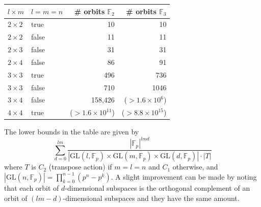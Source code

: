 \documentclass[11pt]{article}
\begin{document}
\begin{center}
  \setlength{\tabcolsep}{12pt}
  \begin{tabular}{llrr}
    $l\times m$ & $l=m=n$ & \# orbits $\mathbb{F}_2$ & \# orbits $\mathbb{F}_3$               \\
    \hline
    $2\times 2$ & true    & 10                       & 10                                     \\
    $2\times 2$ & false   & 11                       & 11                                     \\
    $2\times 3$ & false   & 31                       & 31                                     \\
    $2\times 4$ & false   & 86                       & 91                                     \\
    $3\times 3$ & true    & 496                      & 736                                    \\
    $3\times 3$ & false   & 710                      & 1046                                   \\
    $3\times 4$ & false   & 158,426\footnotemark[1]  & ($>1.6\times 10^{6}$) \footnotemark[2] \\
    $4\times 4$ & true    & ($>1.6\times 10^{11}$)   & ($>8.8\times 10^{15}$)                 \\
  \end{tabular}
\end{center}

The lower bounds in the table are given by
$$\sum_{d=0}^{lm}\frac{|\mathbb{F}_p|^{lmd}}{| \mathrm{GL}(l,\mathbb{F}_p) \times \mathrm{GL}(m,\mathbb{F}_p) \times \mathrm{GL}(d,\mathbb{F}_p)| \cdot |T|}$$ where $T$ is $C_2$ (transpose action) if $m=l=n$ and $C_1$ otherwise, and $\left| \mathrm{GL}(n,\mathbb{F}_p) \right| = \prod_{k=0}^{n-1} (p^n - p^k) $.
A slight improvement can be made by noting that each orbit of $d$-dimensional subspaces is the orthogonal complement of an orbit of $(lm-d)$-dimensional subspaces and they have the same amount.
\end{document}
